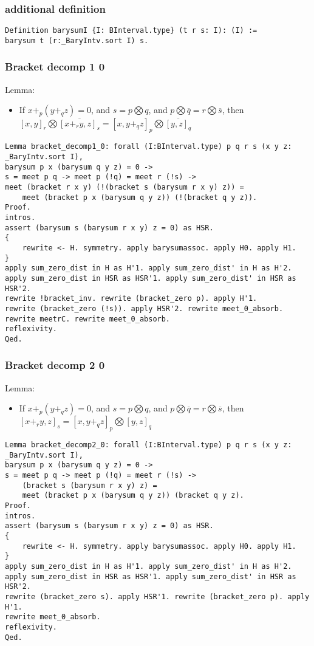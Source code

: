 \documentclass[a4paper,10pt]{article} %
\begin{document}
\subsubsection{additional definition}
\begin{lstlisting}
Definition barysumI {I: BInterval.type} (t r s: I): (I) :=
barysum t (r:_BaryIntv.sort I) s.
\end{lstlisting}

\subsubsection{Bracket decomp 1 0}
Lemma:
\begin{itemize}
    \item If $x + _p(y + _qz) = 0$, and $s = p \bigotimes q$, and $p \bigotimes \overline{q} = r \bigotimes \overline{s}$, then $[x, y]_r \bigotimes \overline{[x + _ry, z]_s} = [x, y + _qz]_p \bigotimes \overline{[y, z]_q}$
\end{itemize}
\begin{lstlisting}
Lemma bracket_decomp1_0: forall (I:BInterval.type) p q r s (x y z: _BaryIntv.sort I),
barysum p x (barysum q y z) = 0 ->
s = meet p q -> meet p (!q) = meet r (!s) ->  
meet (bracket r x y) (!(bracket s (barysum r x y) z)) = 
    meet (bracket p x (barysum q y z)) (!(bracket q y z)).
Proof.
intros.
assert (barysum s (barysum r x y) z = 0) as HSR.
{
    rewrite <- H. symmetry. apply barysumassoc. apply H0. apply H1.
}
apply sum_zero_dist in H as H'1. apply sum_zero_dist' in H as H'2.
apply sum_zero_dist in HSR as HSR'1. apply sum_zero_dist' in HSR as HSR'2.
rewrite !bracket_inv. rewrite (bracket_zero p). apply H'1.
rewrite (bracket_zero (!s)). apply HSR'2. rewrite meet_0_absorb. rewrite meetrC. rewrite meet_0_absorb.
reflexivity.
Qed.
\end{lstlisting}


\subsubsection{Bracket decomp 2 0}
Lemma:
\begin{itemize}
    \item If $x + _p(y + _qz) = 0$, and $s = p \bigotimes q$, and $p \bigotimes \overline{q} = r \bigotimes \overline{s}$, then $[x + _ry, z]_s = [x, y + _qz]_p \bigotimes [y, z]_q$
\end{itemize}
\begin{lstlisting}
Lemma bracket_decomp2_0: forall (I:BInterval.type) p q r s (x y z: _BaryIntv.sort I),
barysum p x (barysum q y z) = 0 ->
s = meet p q -> meet p (!q) = meet r (!s) ->  
    (bracket s (barysum r x y) z) = 
    meet (bracket p x (barysum q y z)) (bracket q y z).
Proof.
intros.
assert (barysum s (barysum r x y) z = 0) as HSR.
{
    rewrite <- H. symmetry. apply barysumassoc. apply H0. apply H1.
}
apply sum_zero_dist in H as H'1. apply sum_zero_dist' in H as H'2.
apply sum_zero_dist in HSR as HSR'1. apply sum_zero_dist' in HSR as HSR'2.
rewrite (bracket_zero s). apply HSR'1. rewrite (bracket_zero p). apply H'1.
rewrite meet_0_absorb.
reflexivity.
Qed.
\end{lstlisting}
\end{document}
